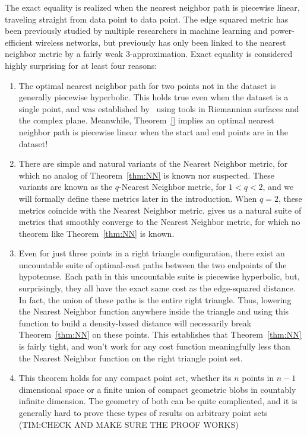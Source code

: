 The exact equality is realized when the nearest neighbor path is piecewise
linear, traveling straight from data point to data point. The edge squared
metric has been previously studied by multiple researchers in machine
learning and power-efficient wireless networks, but previously has only
been linked to the nearest neighbor metric by a fairly weak
3-approximation. Exact equality is considered highly surprising for at
least four reasons:

\begin{enumerate}

\item The optimal nearest neighbor path for two points not in the dataset
	is generally piecewise hyperbolic. This holds true even when the
		dataset is a single point, and was established by~\cite{}
		using tools in Riemannian surfaces and the complex plane.
		Meanwhile, Theorem~\ref{} implies an optimal nearest
		neighbor path is piecewise linear when the start and end
		points are in the dataset!

\item There are simple and natural variants of the Nearest Neighbor metric,
	for which no analog of Theorem~\ref{thm:NN} is known nor suspected.
		These variants are known as the $q$-Nearest Neighbor
		metric, for $1 < q < 2$, and we will formally define these
		metrics later in the introduction. When $q=2$, these
		metrics coincide with the Nearest Neighbor metric. %
		gives us a natural suite of metrics that smoothly converge
		to the Nearest Neighbor metric, for which no theorem like
		Theorem~\ref{thm:NN} is known.

\item Even for just three points in a right triangle configuration, there
	exist an uncountable suite of optimal-cost paths between the two
		endpoints of the hypotenuse. Each path in this uncountable
		suite is piecewise hyperbolic, but, surprisingly, they all
		have the exact same cost as the edge-squared distance. In
		fact, the union of these paths is the entire right
		triangle. Thus, lowering the Nearest Neighbor function
		anywhere inside the triangle and using this function to
		build a density-based distance will necessarily break
		Theorem~\ref{thm:NN} on these points. This establishes that
		Theorem~\ref{thm:NN} is fairly tight, and won't work for
		any cost function meaningfully less than the Nearest
		Neighbor function on the right triangle point set.

\item This theorem holds for any compact point set, whether its $n$ points
	in $n-1$ dimensional space or a finite union of compact geometric
		blobs in countably infinite dimension. The geometry of both
		can be quite complicated, and it is generally hard to prove
		these types of results on arbitrary point sets (TIM:CHECK
		AND MAKE SURE THE PROOF WORKS)

\end{enumerate}

